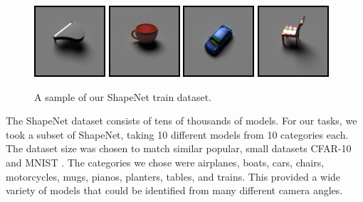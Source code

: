 \documentclass[10pt,twocolumn,letterpaper]{article}
\begin{document}
\begin{figure}[h!]
\centering
\includegraphics[width=0.24\columnwidth]{./assets/piano.jpg}
\includegraphics[width=0.24\columnwidth]{./assets/mug.jpg}
\includegraphics[width=0.24\columnwidth]{./assets/car.jpg}
\includegraphics[width=0.24\columnwidth]{./assets/chair.jpg}
\caption{A sample of our ShapeNet train dataset.}
\label{fig:SHAPENET}
\end{figure}

The ShapeNet dataset consists of tens of thousands of models. For our tasks, we took a subset of ShapeNet, taking 10 different models from 10 categories each. The dataset size was chosen to match similar popular, small datasets CFAR-10 \cite{Krizhevsky09learningmultiple} and MNIST \cite{726791}. The categories we chose were airplanes, boats, cars, chairs, motorcycles, mugs, pianos, planters, tables, and trains. This provided a wide variety of models that could be identified from many different camera angles. 
\end{document}
